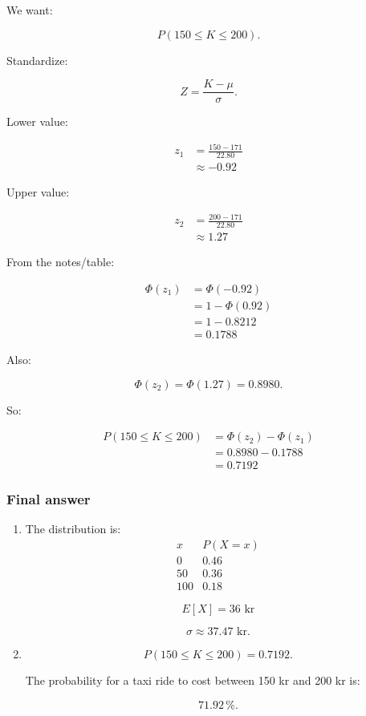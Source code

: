 \documentclass[10pt]{article}
\begin{document}
We want:

\[
P(150\leq K\leq 200).
\]

Standardize:

\[
Z=\frac{K-\mu}{\sigma}.
\]

Lower value:

\begin{align*}
z_1
&=
\frac{150-171}{22.80} \\[2mm]
&\approx -0.92
\end{align*}

Upper value:

\begin{align*}
z_2
&=
\frac{200-171}{22.80} \\[2mm]
&\approx 1.27
\end{align*}

From the notes/table:

\begin{align*}
\Phi(z_1)
&=
\Phi(-0.92) \\[2mm]
&=
1-\Phi(0.92) \\[2mm]
&=
1-0.8212 \\[2mm]
&=0.1788
\end{align*}

Also:

\[
\Phi(z_2)=\Phi(1.27)=0.8980.
\]

So:

\begin{align*}
P(150\leq K\leq 200)
&=
\Phi(z_2)-\Phi(z_1) \\[2mm]
&=
0.8980-0.1788 \\[2mm]
&=0.7192
\end{align*}

\subsubsection*{Final answer}
\begin{enumerate}[label=\alph*)]
\item The distribution is:
\[
\begin{array}{c|c}
x & P(X=x)\\
\hline
0 & 0.46\\
50 & 0.36\\
100 & 0.18
\end{array}
\]

\[
E[X]=36\text{ kr}
\]

\[
\sigma\approx 37.47\text{ kr}.
\]

\item
\[
P(150\leq K\leq 200)
=0.7192.
\]

The probability for a taxi ride to cost between
150 kr and 200 kr is:

\[
71.92\,\%.
\]
\end{enumerate}
\end{document}
